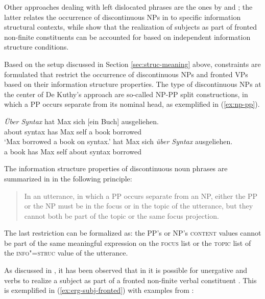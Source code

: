 \documentclass[output=paper
	        ,collection
	        ,collectionchapter
 	        ,biblatex
                ,babelshorthands
                ,newtxmath
                ,draftmode
                ,colorlinks, citecolor=brown
]{langscibook}
\begin{document}
Other approaches dealing with left dislocated phrases are the ones by
\cite{deKuthy2002a} and \citet{dKM2003a}; the latter relates the
occurrence of discontinuous NPs in  to specific
information structural contexts, while \citet{dKM2003a} show that the
realization of subjects as part of fronted non-finite constituents can
be accounted for based on independent information structure
conditions.

Based on the setup discussed in Section \ref{sec:struc-meaning} above,
constraints are formulated that restrict the occurrence of
discontinuous NPs and fronted VPs based on their information structure
properties. The type of discontinuous NPs at the center of De
Kuthy's approach are so-called NP-PP split constructions, in which a PP
occurs separate from its nominal head, as exemplified in
(\ref{ex:np-pp}).

\begin{exe}
  \ex\label{ex:np-pp} \begin{xlist}
    \ex\label{ex:simple-fronted-pp}\gll \textsl{Über Syntax} hat Max sich [ein
 Buch] ausgeliehen.\\
         {about syntax} has Max self { a} book borrowed\\
       \trans `Max borrowed a book on syntax.'
    \ex\label{ex:simple-fronted-np} hat Max sich \textsl{über Syntax}    ausgeliehen.\\
 \spacebr{}a book has Max self {about syntax} borrowed\\
\end{xlist}
\end{exe}

The information structure properties of discontinuous noun phrases are
summarized in \citet[176]{deKuthy2002a} in the following principle:
\begin{quote}
  In an utterance, in which a PP occurs separate from an NP, either
  the PP or the NP must be in the focus or in the topic of the
  utterance, but they cannot both be part of the topic or the same
  focus projection. \citep[176]{deKuthy2002a}
\end{quote}

The last restriction can be formalized as: the PP's or NP's
\textsc{content} values cannot be part of the same
meaningful expression on the \textsc{focus} list or the \textsc{topic}
list of the \textsc{info"=struc} value of the utterance.

As discussed in \cite{dKM2003a}, it has been observed that in
 it is possible for unergative and  verbs to
realize a subject as part of a fronted non-finite verbal
constituent \citep{Haider90a}. This is exemplified in (\ref{ex:erg-subj-fronted}) with examples from \citet[94]{Haider90-ohne-crossref}:
\end{document}
